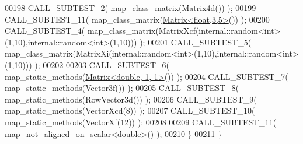 \begin{DoxyCode}
00198     CALL\_SUBTEST\_2( map\_class\_matrix(Matrix4d()) );
00199     CALL\_SUBTEST\_11( map\_class\_matrix(\hyperlink{group___core___module_class_eigen_1_1_matrix}{Matrix<float,3,5>}()) );
00200     CALL\_SUBTEST\_4( map\_class\_matrix(MatrixXcf(internal::random<int>(1,10),internal::random<int>(1,10))) );
00201     CALL\_SUBTEST\_5( map\_class\_matrix(MatrixXi(internal::random<int>(1,10),internal::random<int>(1,10))) );
00202 
00203     CALL\_SUBTEST\_6( map\_static\_methods(\hyperlink{group___core___module_class_eigen_1_1_matrix}{Matrix<double, 1, 1>}()) );
00204     CALL\_SUBTEST\_7( map\_static\_methods(Vector3f()) );
00205     CALL\_SUBTEST\_8( map\_static\_methods(RowVector3d()) );
00206     CALL\_SUBTEST\_9( map\_static\_methods(VectorXcd(8)) );
00207     CALL\_SUBTEST\_10( map\_static\_methods(VectorXf(12)) );
00208     
00209     CALL\_SUBTEST\_11( map\_not\_aligned\_on\_scalar<double>() );
00210   \}
00211 \}
\end{DoxyCode}
